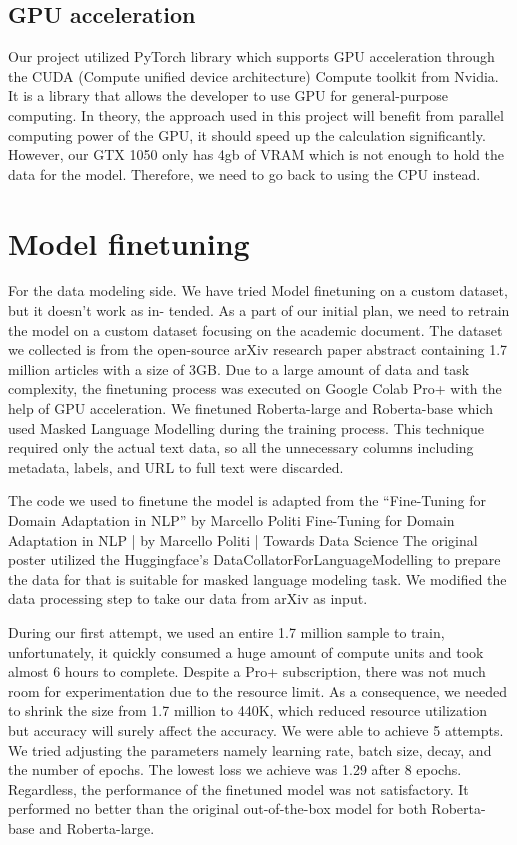 \documentclass[12pt,oneside,openright,a4paper]{cpe-english-project}
\begin{document}
\subsection{GPU acceleration}

Our project utilized PyTorch library which supports GPU acceleration through the CUDA (Compute unified device architecture) Compute toolkit from Nvidia. It is a library that allows the developer to use GPU for general-purpose computing. In theory, the approach used in this project will benefit from parallel computing power of the GPU, it should speed up the calculation significantly. However, our GTX 1050 only has 4gb of VRAM which is not enough to hold the data for the model. Therefore, we need to go back to using the CPU instead.
\section{Model finetuning}

For the data modeling side. We have tried Model finetuning on a custom dataset, but it doesn’t work as in- tended. As a part of our initial plan, we need to retrain the model on a custom dataset focusing on the academic document. The dataset we collected is from the open-source arXiv research paper abstract containing 1.7 million articles with a size of 3GB. Due to a large amount of data and task complexity, the finetuning process was executed on Google Colab Pro+ with the help of GPU acceleration. We finetuned Roberta-large and Roberta-base which used Masked Language Modelling during the training process. This technique required only the actual text data, so all the unnecessary columns including metadata, labels, and URL to full text were discarded. 

The code we used to finetune the model is adapted from the “Fine-Tuning for Domain Adaptation in NLP” by Marcello Politi Fine-Tuning for Domain Adaptation in NLP | by Marcello Politi | Towards Data Science
The original poster utilized the Huggingface’s DataCollatorForLanguageModelling to prepare the data for that is suitable for masked language modeling task. We modified the data processing step to take our data from arXiv as input. 
 
During our first attempt, we used an entire 1.7 million sample to train, unfortunately, it quickly consumed a huge amount of compute units and took almost 6 hours to complete. Despite a Pro+ subscription, there was not much room for experimentation due to the resource limit. As a consequence, we needed to shrink the size from 1.7 million to 440K, which reduced resource utilization but accuracy will surely affect the accuracy. We were able to achieve 5 attempts. We tried adjusting the parameters namely learning rate, batch size, decay, and the number of epochs. The lowest loss we achieve was 1.29 after 8 epochs. Regardless, the performance of the finetuned model was not satisfactory. It performed no better than the original out-of-the-box model for both Roberta-base and Roberta-large.
\end{document}
